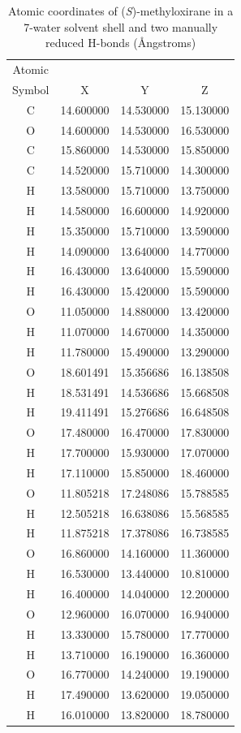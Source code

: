\begin{table}
    \centering
    \caption{Atomic coordinates of (\textit{S})-methyloxirane in a 7-water solvent shell and two manually reduced H-bonds
 (\AA ngstroms)}
    \label{metox_7_short2}
    \begin{tabular}{ c c c c }
    \hline
    \hline
    Atomic & & & \\
    Symbol & X & Y & Z \\
    \hline
	C &  14.600000 &  14.530000 &  15.130000 \\
	O &  14.600000 &  14.530000 &  16.530000 \\
	C &  15.860000 &  14.530000 &  15.850000 \\
	C &  14.520000 &  15.710000 &  14.300000 \\
	H &  13.580000 &  15.710000 &  13.750000 \\
	H &  14.580000 &  16.600000 &  14.920000 \\
	H &  15.350000 &  15.710000 &  13.590000 \\
	H &  14.090000 &  13.640000 &  14.770000 \\
	H &  16.430000 &  13.640000 &  15.590000 \\
	H &  16.430000 &  15.420000 &  15.590000 \\
	O &  11.050000 &  14.880000 &  13.420000 \\
	H &  11.070000 &  14.670000 &  14.350000 \\
	H &  11.780000 &  15.490000 &  13.290000 \\
	O &  18.601491 &  15.356686 &  16.138508 \\
	H &  18.531491 &  14.536686 &  15.668508 \\
	H &  19.411491 &  15.276686 &  16.648508 \\
	O &  17.480000 &  16.470000 &  17.830000 \\
	H &  17.700000 &  15.930000 &  17.070000 \\
	H &  17.110000 &  15.850000 &  18.460000 \\
	O &  11.805218 &  17.248086 &  15.788585 \\
	H &  12.505218 &  16.638086 &  15.568585 \\
	H &  11.875218 &  17.378086 &  16.738585 \\
	O &  16.860000 &  14.160000 &  11.360000 \\
	H &  16.530000 &  13.440000 &  10.810000 \\
	H &  16.400000 &  14.040000 &  12.200000 \\
	O &  12.960000 &  16.070000 &  16.940000 \\
	H &  13.330000 &  15.780000 &  17.770000 \\
	H &  13.710000 &  16.190000 &  16.360000 \\
	O &  16.770000 &  14.240000 &  19.190000 \\
	H &  17.490000 &  13.620000 &  19.050000 \\
	H &  16.010000 &  13.820000 &  18.780000 \\
    \hline
    \hline
    \end{tabular}
\end{table}
